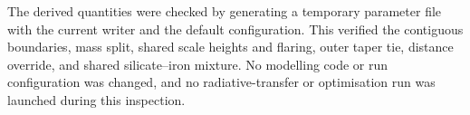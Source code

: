 \documentclass[11pt,a4paper]{article}
\begin{document}
The derived quantities were checked by generating a temporary parameter
file with the current writer and the default configuration. This verified
the contiguous boundaries, mass split, shared scale heights and flaring,
outer taper tie, distance override, and shared silicate--iron mixture.
No modelling code or run configuration was changed, and no
radiative-transfer or optimisation run was launched during this inspection.
\end{document}

